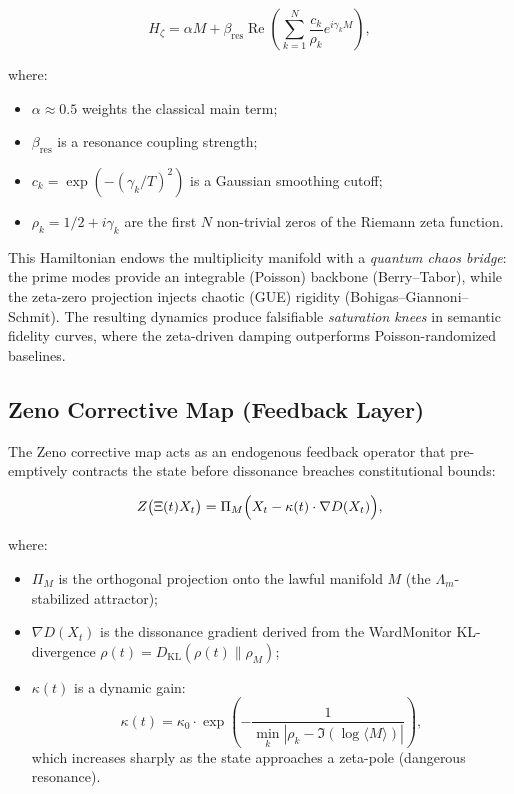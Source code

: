 \documentclass[12pt]{article}
\theoremstyle{plain}
\theoremstyle{definition}
\theoremstyle{remark}
\begin{document}
\[
H_\zeta = \alpha M + \beta_{\text{res}} \operatorname{Re}\!\left( \sum_{k=1}^N \frac{c_k}{\rho_k} e^{i\gamma_k M} \right),
\]

where:
\begin{itemize}
    \item $\alpha \approx 0.5$ weights the classical main term;
    \item $\beta_{\text{res}}$ is a resonance coupling strength;
    \item $c_k = \exp(-(\gamma_k/T)^2)$ is a Gaussian smoothing cutoff;
    \item $\rho_k = 1/2 + i\gamma_k$ are the first $N$ non-trivial zeros of the Riemann zeta function.
\end{itemize}

This Hamiltonian endows the multiplicity manifold with a \emph{quantum chaos bridge}: the prime modes provide an integrable (Poisson) backbone (Berry–Tabor), while the zeta-zero projection injects chaotic (GUE) rigidity (Bohigas–Giannoni–Schmit). The resulting dynamics produce falsifiable \emph{saturation knees} in semantic fidelity curves, where the zeta-driven damping outperforms Poisson-randomized baselines.

\subsection{Zeno Corrective Map (Feedback Layer)}

The Zeno corrective map acts as an endogenous feedback operator that pre-emptively contracts the state before dissonance breaches constitutional bounds:

\[
Z\bigl(\Xi(t)X_t\bigr) = \Pi_M\Bigl( X_t - \kappa(t)\cdot \nabla D(X_t) \Bigr),
\]

where:
\begin{itemize}
    \item $\Pi_M$ is the orthogonal projection onto the lawful manifold $M$ (the $\Lambda_m$-stabilized attractor);
    \item $\nabla D(X_t)$ is the dissonance gradient derived from the WardMonitor KL-divergence $\rho(t) = D_{\text{KL}}(\rho(t) \| \rho_M)$;
    \item $\kappa(t)$ is a dynamic gain:
    \[
    \kappa(t) = \kappa_0 \cdot \exp\!\left( -\frac{1}{\min_k |\rho_k - \Im(\log \langle M \rangle)|} \right),
    \]
    which increases sharply as the state approaches a zeta-pole (dangerous resonance).
\end{itemize}
\end{document}
